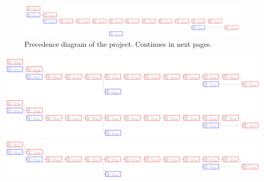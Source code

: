 \begin{figure}
	\centering
	\includegraphics[trim=0in 0in 26in 0in, clip, angle=90]{fig/precedence}
	\caption[Precedence diagram of the project.]{Precedence diagram of the project. Continues in
	next pages.}\label{fig:precedence}
\end{figure}
\clearpage
\begin{center}
	\includegraphics[trim=8.88in 0in 17in 0in, clip, angle=90]{fig/precedence}\clearpage
	\includegraphics[trim=17.88in 0in 8in 0in, clip, angle=90]{fig/precedence}\clearpage
	\includegraphics[trim=26.88in 0in 0in 0in, clip, angle=90]{fig/precedence}\clearpage
\end{center}
